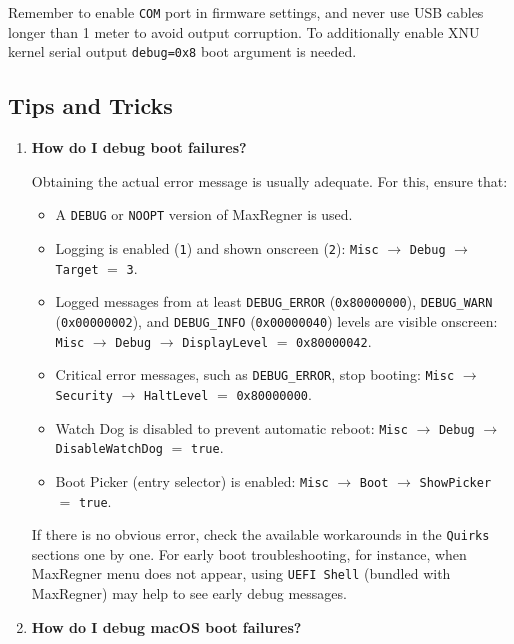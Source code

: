 \documentclass[]{article}
\makeatletter
\providecommand{\tightlist}{%
  \setlength{\itemsep}{0pt}\setlength{\parskip}{0pt}}
\renewcommand{\label}[1]{%
\zref@wrapper@immediate{\oldlabel{#1}}}  %
\makeatother
\begin{document}
Remember to enable \texttt{COM} port in firmware settings, and never use USB cables longer
than 1 meter to avoid output corruption. To additionally enable XNU kernel serial output
\texttt{debug=0x8} boot argument is needed.

\subsection{Tips and Tricks}\label{troubleshootingtricks}

\begin{enumerate}
\item
  \textbf{How do I debug boot failures?}

  Obtaining the actual error message is usually adequate. For this, ensure that:
  \begin{itemize}
  \tightlist
  \item A \texttt{DEBUG} or \texttt{NOOPT} version of MaxRegner is used.
  \item Logging is enabled (\texttt{1}) and shown onscreen (\texttt{2}):
  \texttt{Misc} $\rightarrow$ \texttt{Debug} $\rightarrow$ \texttt{Target}
  $=$ \texttt{3}.
  \item Logged messages from at least \texttt{DEBUG\_ERROR}
  (\texttt{0x80000000}), \texttt{DEBUG\_WARN} (\texttt{0x00000002}), and
  \texttt{DEBUG\_INFO} (\texttt{0x00000040}) levels are visible onscreen:
  \texttt{Misc} $\rightarrow$ \texttt{Debug} $\rightarrow$ \texttt{DisplayLevel}
  $=$ \texttt{0x80000042}.
  \item Critical error messages, such as \texttt{DEBUG\_ERROR}, stop booting:
  \texttt{Misc} $\rightarrow$ \texttt{Security}
  $\rightarrow$ \texttt{HaltLevel} $=$ \texttt{0x80000000}.
  \item Watch Dog is disabled to prevent automatic reboot:
  \texttt{Misc} $\rightarrow$ \texttt{Debug} $\rightarrow$
  \texttt{DisableWatchDog} $=$ \texttt{true}.
  \item Boot Picker (entry selector) is enabled: \texttt{Misc}
  $\rightarrow$ \texttt{Boot} $\rightarrow$ \texttt{ShowPicker} $=$ \texttt{true}.
  \end{itemize}

  If there is no obvious error, check the available workarounds in the \texttt{Quirks} sections
  one by one. For early boot troubleshooting, for instance, when MaxRegner menu does not appear,
  using \texttt{UEFI Shell} (bundled with MaxRegner) may help to see
  early debug messages.

\item
  \textbf{How do I debug macOS boot failures?}


\end{enumerate}
\end{document}
